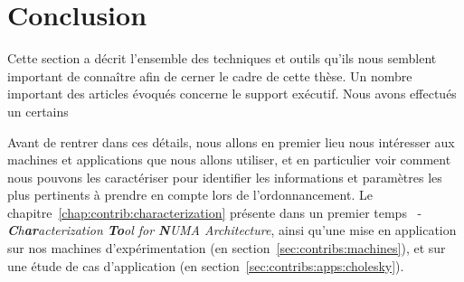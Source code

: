 



\section*{Conclusion}

Cette section a décrit l'ensemble des techniques et outils qu'ils nous semblent important de connaître afin de cerner le cadre de cette thèse.
Un nombre important des articles évoqués concerne le support exécutif.
Nous avons effectués un certains

Avant de rentrer dans ces détails, nous allons en premier lieu nous intéresser aux machines et applications que nous allons utiliser, et en particulier voir comment nous pouvons les caractériser pour identifier les informations et paramètres les plus pertinents à prendre en compte lors de l'ordonnancement.
Le chapitre~\ref{chap:contrib:characterization} présente dans un premier temps \outil~- \emph{\textbf{C}h\textbf{ar}acterization \textbf{To}ol for \textbf{N}UMA Architecture}, ainsi qu'une mise en application sur nos machines d'expérimentation (en section~\ref{sec:contribs:machines}), et sur une étude de cas d'application (en section~\ref{sec:contribs:apps:cholesky}).


